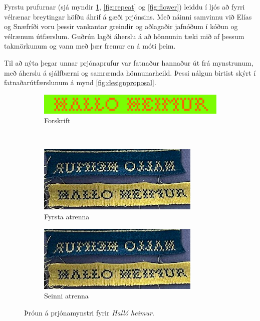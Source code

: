 \documentclass[a4paper,10pt,twocolumn]{article}
\begin{document}
Fyrstu prufurnar (sjá myndir \ref{fig:hallo_heimur}, \ref{fig:repeat} og \ref{fig:flower}) leiddu í ljós að fyrri vélrænar breytingar höfðu áhrif á gæði prjónsins. Með náinni samvinnu við Elías og Snæfríði voru þessir vankantar greindir og aðlagaðir jafnóðum í kóðun og vélrænum útfærslum. Guðrún lagði áherslu á að hönnunin tæki mið af þessum takmörkunum og vann með þær fremur en á móti þeim.

Til að nýta þegar unnar prjónaprufur var fatnaður hannaður út frá mynstrunum, með áherslu
á sjálfbærni og samræmda hönnunarheild. Þessi nálgun birtist skýrt í fatnaðarútfærslunum 
á mynd \ref{fig:designproposal}.

\begin{figure}
    \centering
    \begin{subfigure}[b]{\linewidth}
        \includegraphics[width=\linewidth, clip=true, trim=0 5mm 0 0]{figs/hallo_heimur_forskrift.png}
        \caption{Forskrift}
    \end{subfigure}
    \\
    \begin{subfigure}[b]{0.48\linewidth}
        \includegraphics[width=\linewidth, clip=true, trim=0 5mm 0 0]{figs/hallo_heimur_prjon.png}
        \caption{Fyrsta atrenna}
    \end{subfigure}
    \hfill
    \begin{subfigure}[b]{0.48\linewidth}
        \includegraphics[width=\linewidth, clip=true, trim=0 0 0 5mm]{figs/hallo_heimur_prjon.png}
        \caption{Seinni atrenna}
    \end{subfigure}
    \caption{Þróun á prjónamynstri fyrir \textit{Halló heimur}.}
    \label{fig:hallo_heimur}
\end{figure}
\end{document}
